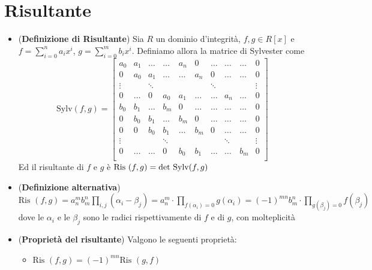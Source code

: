 \documentclass[a4paper,NoNotes,GeneralMath]{stdmdoc}
\newcommand{\Ris}{\text{Ris }}
\begin{document}
	\section*{Risultante}
	\begin{itemize}
		\item ({\bf Definizione di Risultante}) Sia $R$ un dominio d'integrità, $f, g \in R[x]$ e $f = \sum_{i=0}^n a_i x^i$, $g = \sum_{i=0}^m b_i x^i$. Definiamo allora la matrice di Sylvester come
		$$ \text{Sylv}(f, g) = \left[ \begin{array}{cccccccccc}
		a_0     & a_1     & \ldots  & \ldots  & a_n     & 0       & \ldots  & \ldots  & \ldots  & 0       \\
		0       & a_0     & a_1     & \ldots  & \ldots  & a_n     & 0       & \ldots  & \ldots  & 0       \\
		\vdots  &         & \ddots  &         &         &         & \ddots  &         &         & \vdots  \\
		0       & \ldots  & 0       & a_0     & a_1     & \ldots  & \ldots  & a_n     & \ldots  & 0       \\ \hline
		b_0     & b_1     & \ldots  & b_m     & 0       & \ldots  & \ldots  & \ldots  & \ldots  & 0       \\
		0       & b_0     & b_1     & \ldots  & b_m     & 0       & \ldots  & \ldots  & \ldots  & 0       \\
		0       & 0       & b_0     & b_1     & \ldots  & b_m     & 0       & \ldots  & \ldots  & 0       \\
		\vdots  &         &         & \ddots  &         &         &         & \ddots  &         & \vdots  \\
		0       & \ldots  & \ldots  & 0       & b_0     & b_1     & \ldots  & \ldots  & b_m     & 0       \\
		\end{array} \right]$$
		Ed il risultante di $f$ e $g$ è $\Ris(f, g) = \Det \text{Sylv}(f, g)$
		\item ({\bf Definizione alternativa}) $\Ris(f, g) = a_n^m b_m^n \prod_{i,j} (\alpha_i - \beta_j) = a_n^m \cdot \prod_{f(\alpha_i) = 0} g(\alpha_i) = (-1)^{mn} b_m^n \cdot \prod_{g(\beta_j) = 0} f(\beta_j)$ dove le $\alpha_i$ e le $\beta_j$ sono le radici rispettivamente di $f$ e di $g$, con molteplicità
		\item ({\bf Proprietà del risultante}) Valgono le seguenti proprietà:
			\begin{itemize}
				\item $\Ris(f, g) = (-1)^{mn} \Ris(g, f)$

\end{itemize}
\end{itemize}
\end{document}

